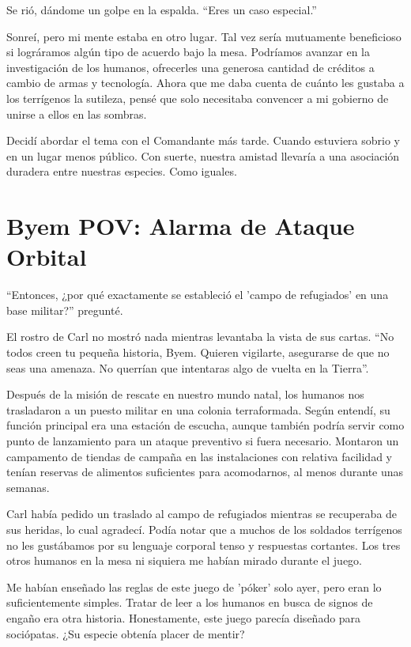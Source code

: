 \documentclass[spanish,12pt,a4paper,oneside,titlepage]{book}
\begin{document}
    Se rió, dándome un golpe en la espalda. ``Eres un caso especial.''

    Sonreí, pero mi mente estaba en otro lugar. Tal vez sería mutuamente beneficioso si lográramos algún tipo de acuerdo bajo la mesa. Podríamos avanzar en la investigación de los humanos, ofrecerles una generosa cantidad de créditos a cambio de armas y tecnología. Ahora que me daba cuenta de cuánto les gustaba a los terrígenos la sutileza, pensé que solo necesitaba convencer a mi gobierno de unirse a ellos en las sombras.

    Decidí abordar el tema con el Comandante más tarde. Cuando estuviera sobrio y en un lugar menos público. Con suerte, nuestra amistad llevaría a una asociación duradera entre nuestras especies. Como iguales.

    \chapter{Byem POV: Alarma de Ataque Orbital}

    ``Entonces, ¿por qué exactamente se estableció el 'campo de refugiados' en una base militar?'' pregunté.

    El rostro de Carl no mostró nada mientras levantaba la vista de sus cartas. ``No todos creen tu pequeña historia, Byem. Quieren vigilarte, asegurarse de que no seas una amenaza. No querrían que intentaras algo de vuelta en la Tierra''.

    Después de la misión de rescate en nuestro mundo natal, los humanos nos trasladaron a un puesto militar en una colonia terraformada. Según entendí, su función principal era una estación de escucha, aunque también podría servir como punto de lanzamiento para un ataque preventivo si fuera necesario. Montaron un campamento de tiendas de campaña en las instalaciones con relativa facilidad y tenían reservas de alimentos suficientes para acomodarnos, al menos durante unas semanas.

    Carl había pedido un traslado al campo de refugiados mientras se recuperaba de sus heridas, lo cual agradecí. Podía notar que a muchos de los soldados terrígenos no les gustábamos por su lenguaje corporal tenso y respuestas cortantes. Los tres otros humanos en la mesa ni siquiera me habían mirado durante el juego.

    Me habían enseñado las reglas de este juego de 'póker' solo ayer, pero eran lo suficientemente simples. Tratar de leer a los humanos en busca de signos de engaño era otra historia. Honestamente, este juego parecía diseñado para sociópatas. ¿Su especie obtenía placer de mentir?
\end{document}
